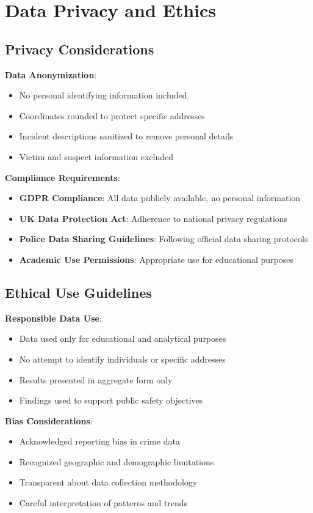 \documentclass[12pt,a4paper]{article}
\begin{document}
\section{Data Privacy and Ethics}

\subsection{Privacy Considerations}

\textbf{Data Anonymization}:
\begin{itemize}
    \item No personal identifying information included
    \item Coordinates rounded to protect specific addresses
    \item Incident descriptions sanitized to remove personal details
    \item Victim and suspect information excluded
\end{itemize}

\textbf{Compliance Requirements}:
\begin{itemize}
    \item \textbf{GDPR Compliance}: All data publicly available, no personal information
    \item \textbf{UK Data Protection Act}: Adherence to national privacy regulations
    \item \textbf{Police Data Sharing Guidelines}: Following official data sharing protocols
    \item \textbf{Academic Use Permissions}: Appropriate use for educational purposes
\end{itemize}

\subsection{Ethical Use Guidelines}

\textbf{Responsible Data Use}:
\begin{itemize}
    \item Data used only for educational and analytical purposes
    \item No attempt to identify individuals or specific addresses
    \item Results presented in aggregate form only
    \item Findings used to support public safety objectives
\end{itemize}

\textbf{Bias Considerations}:
\begin{itemize}
    \item Acknowledged reporting bias in crime data
    \item Recognized geographic and demographic limitations
    \item Transparent about data collection methodology
    \item Careful interpretation of patterns and trends
\end{itemize}
\end{document}
